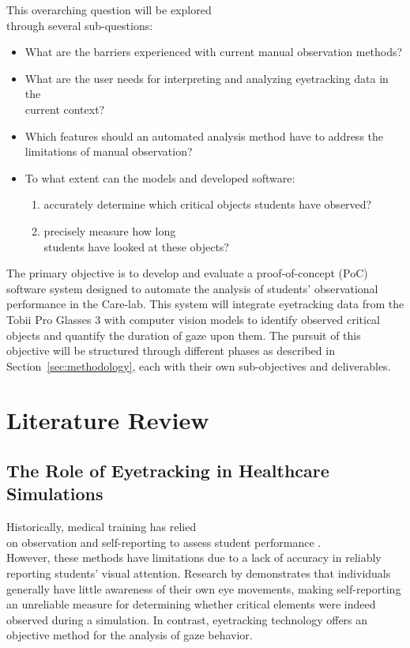 \documentclass[english]{hogent-article}
\begin{document}
This overarching question will be explored\\ through several sub-questions:
\begin{itemize}
  \item What are the barriers experienced with current manual observation methods?
  \item What are the user needs for interpreting and analyzing eyetracking data in the\\ current context?
  \item Which features should an automated analysis method have to address the limitations of manual observation?
  \item To what extent can the models and developed software:
    \begin{enumerate}
      \item accurately determine which critical objects students have observed?
      \item precisely measure how long\\ students have looked at these objects?
    \end{enumerate}
\end{itemize}

The primary objective is to develop and evaluate a proof-of-concept (PoC) software system designed to automate the analysis of students' observational performance in the Care-lab.
This system will integrate eyetracking data from the Tobii Pro Glasses 3 with computer vision models to identify observed critical objects and quantify the duration of gaze upon them.
The pursuit of this objective will be structured through different phases as described in Section~\ref{sec:methodology}, each with their own sub-objectives and deliverables.

\section{Literature Review}
\label{sec:literature-review}

\subsection{The Role of Eyetracking in Healthcare Simulations}

Historically, medical training has relied\\ on observation and self-reporting to assess student performance \autocite{Pauszek2023}.\\
However, these methods have limitations due to a lack of accuracy in reliably reporting students' visual attention. 
Research by \textcite{Clarke2017} demonstrates that individuals generally have little awareness of their own eye movements, 
making self-reporting an unreliable measure for determining whether critical elements were indeed observed during a simulation. 
In contrast, eyetracking technology offers an objective method for the analysis of gaze behavior.
\end{document}
